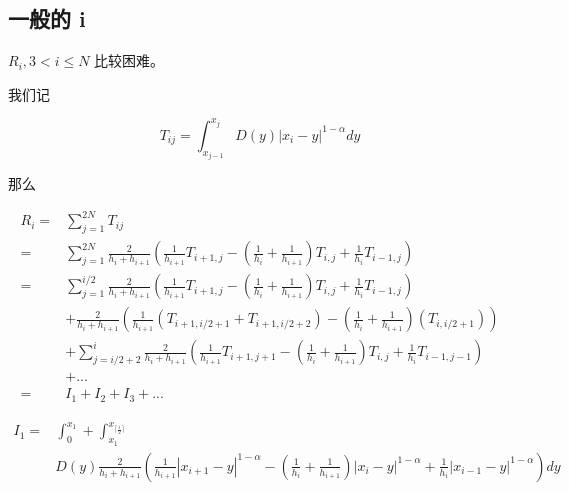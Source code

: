 \documentclass{ctexart}
\begin{document}
\subsection{一般的 i}



\(R_i, 3<i\le N\) 比较困难。


我们记

\begin{equation}
    T_{ij} = \int_{x_{j-1}}^{x_{j}} D(y) |x_i - y|^{1-\alpha} dy
\end{equation}

那么

\begin{equation}
    \begin{aligned}
        R_i =& \sum_{j=1}^{2N} T_{ij}    \\
        =& \sum_{j=1}^{2N} \frac{2}{h_i + h_{i+1}} 
        \left( \frac{1}{h_{i+1}} T_{i+1, j} 
        - (\frac{1}{h_{i}}+\frac{1}{h_{i+1}}) T_{i,j}
        +  \frac{1}{h_{i}} T_{i-1, j} \right)   \\
        = & \sum_{j=1}^{i/2} \frac{2}{h_i + h_{i+1}} 
        \left( \frac{1}{h_{i+1}} T_{i+1, j} 
        - (\frac{1}{h_{i}}+\frac{1}{h_{i+1}}) T_{i,j}
        +  \frac{1}{h_{i}} T_{i-1, j} \right)   \\
          & + \frac{2}{h_i + h_{i+1}} 
          \left( \frac{1}{h_{i+1}} (T_{i+1, i/2+1} +  T_{i+1, i/2+2})
          - (\frac{1}{h_{i}}+\frac{1}{h_{i+1}}) (T_{i,i/2+1}) \right)   \\
          & + \sum_{j=i/2+2}^{i} \frac{2}{h_i + h_{i+1}} 
          \left( \frac{1}{h_{i+1}} T_{i+1, j+1} 
          - (\frac{1}{h_{i}}+\frac{1}{h_{i+1}}) T_{i,j}
          +  \frac{1}{h_{i}} T_{i-1, j-1} \right)   \\
          & + ...       \\
        = & I_1 + I_2 + I_3 + ...
    \end{aligned}
\end{equation}


\begin{equation}
    \begin{aligned}
        I_1 =& \int_0^{x_1} +\int_{x_1}^{x_{\lceil \frac{i}{2}\rceil}}               \\ 
        & D(y) \frac{2}{h_i + h_{i+1}} 
        ( \frac{1}{h_{i+1}} |x_{i+1}-y|^{1-\alpha} 
        - (\frac{1}{h_{i}}+\frac{1}{h_{i+1}}) |x_{i}-y|^{1-\alpha}
        +  \frac{1}{h_{i}}|x_{i-1}-y|^{1-\alpha} )  dy 
    \end{aligned}
\end{equation}
\end{document}
